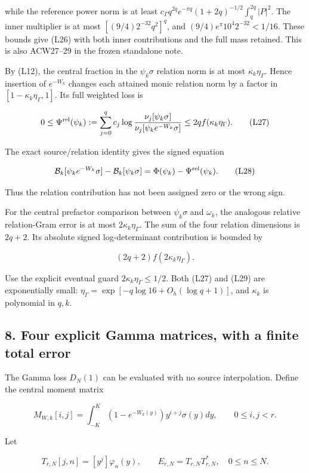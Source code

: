 while the reference power norm is at least
\(c_\Gamma q^{2q}e^{-\pi q}(1+2q)^{-1/2}\int_q^{2q}|P|^2\).
The inner multiplier is at most \([(9/4)2^{-32}q^2]^q\), and
\((9/4)e^\pi10^4 2^{-32}<1/16\). These bounds give (L26) with both inner contributions and the full mass retained. This is also ACW27--29 in the frozen standalone note.

By (L12), the central fraction in the \(\psi_k\sigma\) relation norm is at most \(\kappa_k\eta_\Gamma\). Hence insertion of \(e^{-W_k}\) changes each attained monic relation norm by a factor in
\([1-\kappa_k\eta_\Gamma,1]\). Its full weighted loss is

\[
0\le\Psi^{\rm rel}(\psi_k)
:=\sum_{j=0}^qc_j\log\frac{\nu_j[\psi_k\sigma]}
{\nu_j[\psi_ke^{-W_k}\sigma]}
\le2q f(\kappa_k\eta_\Gamma).
\tag{L27}
\]

The exact source/relation identity gives the signed equation

\[
\mathcal B_k[\psi_ke^{-W_k}\sigma]-\mathcal B_k[\psi_k\sigma]
=\Phi(\psi_k)-\Psi^{\rm rel}(\psi_k).
\tag{L28}
\]

Thus the relation contribution has not been assigned zero or the wrong sign.

For the central prefactor comparison between \(\psi_k\sigma\) and \(\omega_k\), the analogous relative relation-Gram error is at most \(2\kappa_k\eta_\Gamma\). The sum of the four relation dimensions is \(2q+2\). Its absolute signed log-determinant contribution is bounded by

\[
(2q+2)f(2\kappa_k\eta_\Gamma).
\tag{L29}
\]

Use the explicit eventual guard \(2\kappa_k\eta_\Gamma\le1/2\). Both (L27) and (L29) are exponentially small: \(\eta_\Gamma=\exp[-q\log16+O_h(\log q+1)]\), and \(\kappa_k\) is polynomial in \(q,k\).

\subsection{8. Four explicit Gamma matrices, with a finite total error}\label{loc:four-explicit-gamma-matrices-with-a-finite-total-error}

The Gamma loss \(D_N(1)\) can be evaluated with no source interpolation. Define the central moment matrix

\[
M_{W,k}[i,j]=\int_{-K}^{K}
(1-e^{-W_k(y)})y^{i+j}\sigma(y)dy,
\qquad0\le i,j<r.
\tag{L30}
\]

Let

\[
T_{r,N}[j,n]=[y^j]\varphi_n(y),\qquad
E_{r,N}=T_{r,N}T_{r,N}^*,\quad 0\le n\le N.
\tag{L31}
\]

